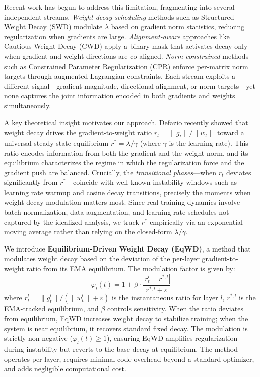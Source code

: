 \documentclass{article}
\begin{document}
Recent work has begun to address this limitation, fragmenting into
several independent streams. \emph{Weight decay scheduling} methods such
as Structured Weight Decay (SWD) \citep{xie2023swd} modulate $\lambda$
based on gradient norm statistics, reducing regularization when
gradients are large. \emph{Alignment-aware} approaches like Cautious
Weight Decay (CWD) \citep{chen2026cwd} apply a binary mask that activates
decay only when gradient and weight directions are co-aligned.
\emph{Norm-constrained} methods such as Constrained Parameter
Regularization (CPR) \citep{franke2024cpr} enforce per-matrix norm
targets through augmented Lagrangian constraints. Each stream exploits a
different signal---gradient magnitude, directional alignment, or norm
targets---yet none captures the joint information encoded in both
gradients and weights simultaneously.

A key theoretical insight motivates our approach. Defazio
\citep{defazio2025} recently showed that weight decay drives the
gradient-to-weight ratio $r_t = \|g_t\| / \|w_t\|$ toward a universal
steady-state equilibrium $r^* = \lambda / \gamma$ (where $\gamma$ is
the learning rate). This ratio encodes information from both the
gradient and the weight norm, and its equilibrium characterizes the
regime in which the regularization force and the gradient push are
balanced. Crucially, the \emph{transitional phases}---when $r_t$
deviates significantly from $r^*$---coincide with well-known
instability windows such as learning rate warmup and cosine decay
transitions, precisely the moments when weight decay modulation matters
most. Since real training dynamics involve batch normalization, data
augmentation, and learning rate schedules not captured by the idealized
analysis, we track $r^*$ empirically via an exponential moving average
rather than relying on the closed-form $\lambda/\gamma$.

We introduce \textbf{Equilibrium-Driven Weight Decay (EqWD)}, a method
that modulates weight decay based on the deviation of the per-layer
gradient-to-weight ratio from its EMA equilibrium. The modulation factor
is given by:
\begin{equation}
\varphi_l(t) = 1 + \beta \cdot \frac{|r_t^l - r^{*,l}|}{r^{*,l} + \varepsilon}
\label{eq:modulation}
\end{equation}
where $r_t^l = \|g_t^l\| / (\|w_t^l\| + \varepsilon)$ is the
instantaneous ratio for layer $l$, $r^{*,l}$ is the EMA-tracked
equilibrium, and $\beta$ controls sensitivity. When the ratio deviates
from equilibrium, EqWD increases weight decay to stabilize training;
when the system is near equilibrium, it recovers standard fixed decay.
The modulation is strictly non-negative ($\varphi_l(t) \geq 1$),
ensuring EqWD amplifies regularization during instability but reverts to
the base decay at equilibrium. The method operates per-layer, requires
minimal code overhead beyond a standard optimizer, and adds negligible
computational cost.
\end{document}
